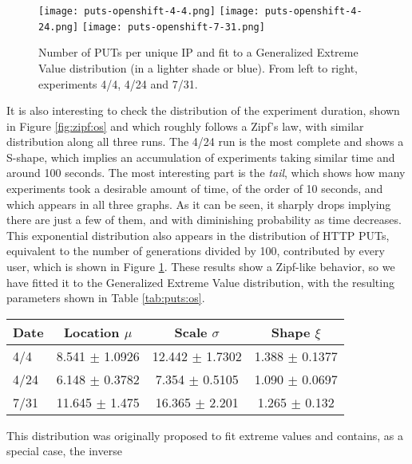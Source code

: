 \documentclass[journal,onecolumn]{IEEEtran}
\begin{document}
\begin{figure}[!htb]
\centering
\texttt{[image: puts-openshift-4-4.png]}
\texttt{[image: puts-openshift-4-24.png]}
\texttt{[image: puts-openshift-7-31.png]}
\caption{Number of PUTs per unique IP and fit to a Generalized
  Extreme Value distribution (in a lighter shade or blue). From left to right, experiments
  4/4, 4/24 and 7/31.} 
\label{fig:puts:os}
\end{figure}
%
It is also interesting to check the distribution of the experiment
duration, shown in Figure \ref{fig:zipf:os} and which roughly follows
a Zipf's law, with similar distribution along all three runs. The 4/24
run is the most complete and shows a S-shape, which implies an
accumulation of experiments taking similar time and around 100
seconds. The most interesting part is the {\em tail}, which shows how
many experiments took a desirable amount of time, of the order of
10 seconds, and which appears in all three graphs. As it can be seen,
it sharply drops implying there are 
just a few of them, and with diminishing probability as time
decreases. This exponential distribution also appears in the
distribution of HTTP PUTs, equivalent to the number of
generations divided by 100, contributed by every user, which is shown
in Figure \ref{fig:puts:os}. These results show a Zipf-like behavior,
so we have fitted it to the Generalized Extreme Value distribution,
with the resulting parameters shown in Table \ref{tab:puts:os}.
%
\begin{table*}
\caption{Summary of fit to Generalized Extreme Value distribution of
  the number of PUTs per unique IP. \label{tab:puts:os}}
\begin{center}
\begin{tabular}{l|ccc}
\hline
Date  & Location $\mu$ & Scale $\sigma$ & Shape $\xi$ \\
\hline
4/4 &  8.541 $\pm$ 1.0926  &    12.442 $\pm$ 1.7302 &  1.388 $\pm$
0.1377 \\
4/24 & 6.148 $\pm$ 0.3782 & 7.354 $\pm$ 0.5105 & 1.090 $\pm$  0.0697  \\
7/31 & 11.645 $\pm$ 1.475 & 16.365 $\pm$ 2.201 &  1.265 $\pm$ 0.132   \\
\hline
\end{tabular}
\end{center}
\end{table*}
%
This distribution was originally proposed to fit extreme values
\cite{resnick2013extreme} and contains, as a special case, the inverse
\end{document}
